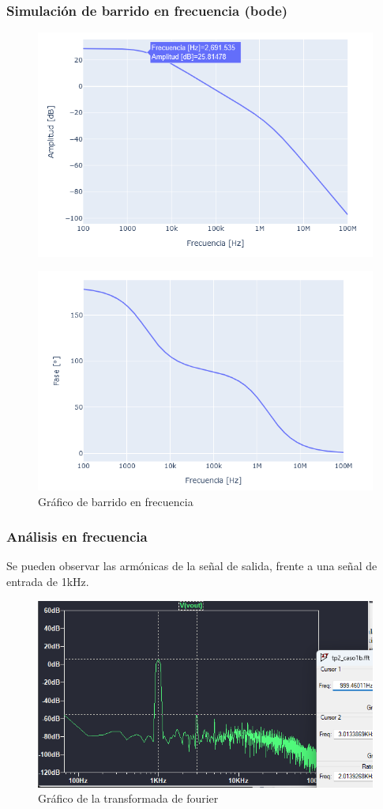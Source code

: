 \subsubsection{Simulación de barrido en frecuencia (bode)}

\begin{figure}[h!]
    \centering
    \includegraphics[width=0.80\linewidth]{img/TP2_2_grafico_bode_amp.png}
\end{figure}

\begin{figure}[h!]
    \centering
    \includegraphics[width=0.80\linewidth]{img/TP2_2_grafico_bode_fase.png}
    \caption{Gráfico de barrido en frecuencia}
    \label{fig:bode}
\end{figure}

\subsubsection{Análisis en frecuencia }

Se pueden observar las armónicas de la señal de salida, frente a una señal de entrada de 1kHz.
\begin{figure}[h!]
    \centering
    \includegraphics[width=0.80\linewidth]{img/ftt.png}
    \caption{Gráfico de la transformada de fourier}
    \label{fig:fft}
\end{figure}

